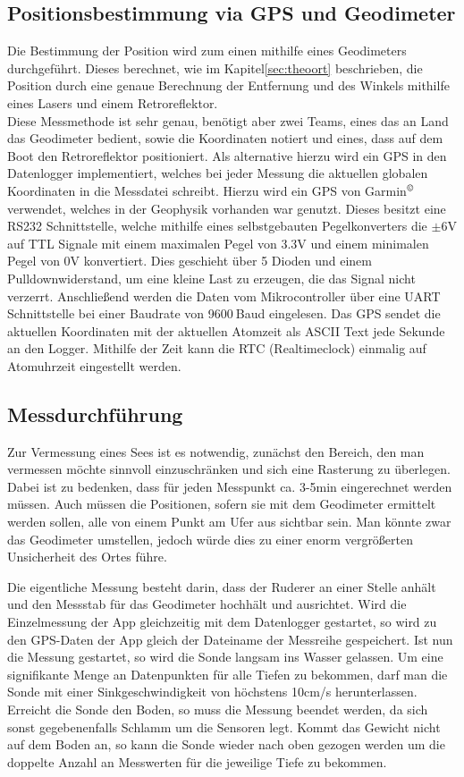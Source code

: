 \documentclass[12pt,a4paper,titlepage,headinclude,bibtotoc]{scrartcl}
\begin{document}
\subsection{Positionsbestimmung via GPS und Geodimeter}
\label{sec:durchpos}
Die Bestimmung der Position wird zum einen mithilfe eines Geodimeters durchgeführt.
Dieses berechnet, wie im Kapitel\ref{sec:theoort} beschrieben, die Position durch eine genaue Berechnung der Entfernung und des Winkels mithilfe eines Lasers und einem Retroreflektor.\\
Diese Messmethode ist sehr genau, benötigt aber zwei Teams, eines das an Land das Geodimeter bedient, sowie die Koordinaten notiert und eines, dass auf dem Boot den Retroreflektor positioniert.
Als alternative hierzu wird ein GPS in den Datenlogger implementiert, welches bei jeder Messung die aktuellen globalen Koordinaten in die Messdatei schreibt.
Hierzu wird ein GPS von Garmin$^{\copyright}$ verwendet, welches in der Geophysik vorhanden war genutzt.
Dieses besitzt eine RS232 Schnittstelle, welche mithilfe eines selbstgebauten Pegelkonverters die $\pm6\si{\volt}$ auf TTL Signale mit einem maximalen Pegel von 3.3\si{\volt} und einem minimalen Pegel von 0\si{\volt} konvertiert.
Dies geschieht über 5 Dioden und einem Pulldownwiderstand, um eine kleine Last zu erzeugen, die das Signal nicht verzerrt.
Anschließend werden die Daten vom Mikrocontroller über eine UART Schnittstelle bei einer Baudrate von 9600$~$Baud eingelesen.
Das GPS sendet die aktuellen Koordinaten mit der aktuellen Atomzeit als ASCII Text jede Sekunde an den Logger.
Mithilfe der Zeit kann die RTC (Realtimeclock) einmalig auf Atomuhrzeit eingestellt werden.

\subsection{Messdurchführung}

Zur Vermessung eines Sees ist es notwendig, zunächst den Bereich, den man vermessen möchte sinnvoll einzuschränken und sich eine Rasterung zu überlegen.
Dabei ist zu bedenken, dass für jeden Messpunkt ca. 3-5min eingerechnet werden müssen.
Auch müssen die Positionen, sofern sie mit dem Geodimeter ermittelt werden sollen, alle von einem Punkt am Ufer aus sichtbar sein.
Man könnte zwar das Geodimeter umstellen, jedoch würde dies zu einer enorm vergrößerten Unsicherheit des Ortes führe.

Die eigentliche Messung besteht darin, dass der Ruderer an einer Stelle anhält und den Messstab für das Geodimeter hochhält und ausrichtet.
Wird die Einzelmessung der App gleichzeitig mit dem Datenlogger gestartet, so wird zu den GPS-Daten der App gleich der Dateiname der Messreihe gespeichert.
Ist nun die Messung gestartet, so wird die Sonde langsam ins Wasser gelassen.
Um eine signifikante Menge an Datenpunkten für alle Tiefen zu bekommen, darf man die Sonde mit einer Sinkgeschwindigkeit von höchstens 10cm/s herunterlassen.
Erreicht die Sonde den Boden, so muss die Messung beendet werden, da sich sonst gegebenenfalls Schlamm um die Sensoren legt.
Kommt das Gewicht nicht auf dem Boden an, so kann die Sonde wieder nach oben gezogen werden um die doppelte Anzahl an Messwerten für die jeweilige Tiefe zu bekommen.
\end{document}
